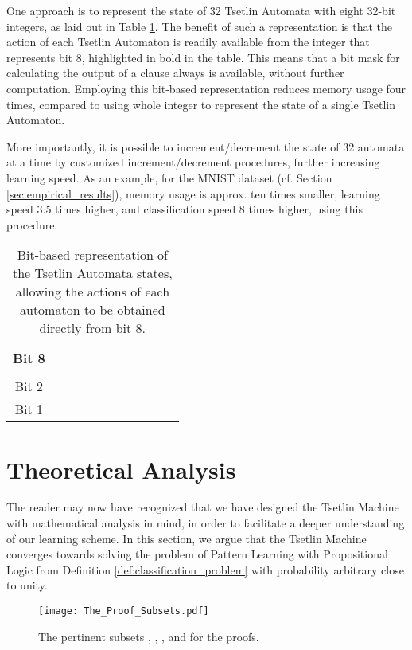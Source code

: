 \documentclass[11pt,a4paper]{article}
\begin{document}
One approach is to represent the state of 32 Tsetlin Automata with eight 32-bit integers, as laid out in Table \ref{tab:bit_representation}. The benefit of such a representation is that the action of each Tsetlin Automaton is readily available from the integer that represents bit 8, highlighted in bold in the table. This means that a bit mask for calculating the output of a clause always is available, without further computation. Employing this bit-based representation reduces memory usage four times, compared to using whole integer to represent the state of a single Tsetlin Automaton.

More importantly, it is possible to increment/decrement the state of 32 automata at a time by customized increment/decrement procedures, further increasing learning speed. As an example, for the MNIST dataset (cf. Section \ref{sec:empirical_results}), memory usage is approx. ten times smaller, learning speed 3.5 times higher, and classification speed 8 times higher, using this procedure.

\begin{table}[ht]
    \centering
    \begin{tabular}{c|c|c|c|c||c||c|c|c|c||c}
    &&&&&&&&&&\\
    \hline
   \textbf{Bit 8}&&&&&&&&&&\\
    &&&&&& &&&&\\
    Bit 2&&&&&&&&&&\\
    Bit 1&&&&&&&&&&\\
    \end{tabular}
    \caption{Bit-based representation of the Tsetlin Automata states, allowing the actions of each automaton to be obtained directly from bit 8.}
    \label{tab:bit_representation}
\end{table}

\section{Theoretical Analysis}
\label{sec:theoretical_results}

The reader may now have recognized that we have designed the Tsetlin Machine with mathematical analysis in mind, in order to facilitate a deeper understanding of our learning scheme. In this section, we argue that the Tsetlin Machine converges towards solving the problem of Pattern Learning with Propositional Logic from Definition \ref{def:classification_problem} with probability arbitrary close to unity.

\begin{figure}[!th]
\centering
\texttt{[image: The\_Proof\_Subsets.pdf]}
\caption{The pertinent subsets , , , and  for the proofs.}
\label{figure:pertinent_subsets}
\end{figure}
\end{document}
